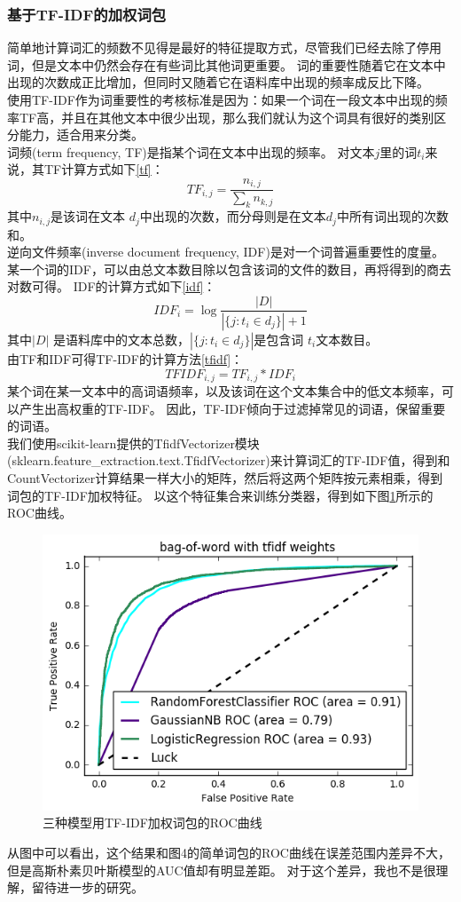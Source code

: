 \subsubsection{基于TF-IDF的加权词包}
简单地计算词汇的频数不见得是最好的特征提取方式，尽管我们已经去除了停用词，但是文本中仍然会存在有些词比其他词更重要。
词的重要性随着它在文本中出现的次数成正比增加，但同时又随着它在语料库中出现的频率成反比下降。\\
使用TF-IDF作为词重要性的考核标准是因为：如果一个词在一段文本中出现的频率TF高，并且在其他文本中很少出现，那么我们就认为这个词具有很好的类别区分能力，适合用来分类。\\
词频(term frequency, TF)是指某个词在文本中出现的频率。
对文本$ j $里的词$ t_i $来说，其TF计算方式如下\ref{tf}：
\begin{equation}\label{tf}
  TF_{i, j} = \frac{n_{i, j}}{\sum_{k}n_{k, j}}
\end{equation}
其中$ n_{i, j}$是该词在文本 $ d_j $中出现的次数，而分母则是在文本$ d_j $中所有词出现的次数和。\\
逆向文件频率(inverse document frequency, IDF)是对一个词普遍重要性的度量。
某一个词的IDF，可以由总文本数目除以包含该词的文件的数目，再将得到的商去对数可得。
IDF的计算方式如下\ref{idf}：
\begin{equation}\label{idf}
  IDF_i = \log\frac{{| D |}}{| \{ j: t_i \in d_j \} | + 1}
\end{equation}
其中$ | D | $ 是语料库中的文本总数，$ | \{ j : t_i \in d_j \} | $是包含词 $ t_i $文本数目。\\
由TF和IDF可得TF-IDF的计算方法\ref{tfidf}：
\begin{equation}\label{tfidf}
  TFIDF_{i, j} = TF_{i, j} * IDF_{i}
\end{equation}
某个词在某一文本中的高词语频率，以及该词在这个文本集合中的低文本频率，可以产生出高权重的TF-IDF。
因此，TF-IDF倾向于过滤掉常见的词语，保留重要的词语。\\
我们使用scikit-learn提供的TfidfVectorizer模块(sklearn.feature\_extraction.text.TfidfVectorizer)来计算词汇的TF-IDF值，得到和CountVectorizer计算结果一样大小的矩阵，然后将这两个矩阵按元素相乘，得到词包的TF-IDF加权特征。
以这个特征集合来训练分类器，得到如下图\ref{fig:3croctfidf}所示的ROC曲线。
\begin{figure}[h]
\centering
\includegraphics[width=0.9\linewidth]{3c_roc_tfidf}
\caption[roctfidf]{三种模型用TF-IDF加权词包的ROC曲线}
\label{fig:3croctfidf}
\end{figure}

从图中可以看出，这个结果和图4的简单词包的ROC曲线在误差范围内差异不大，但是高斯朴素贝叶斯模型的AUC值却有明显差距。
对于这个差异，我也不是很理解，留待进一步的研究。